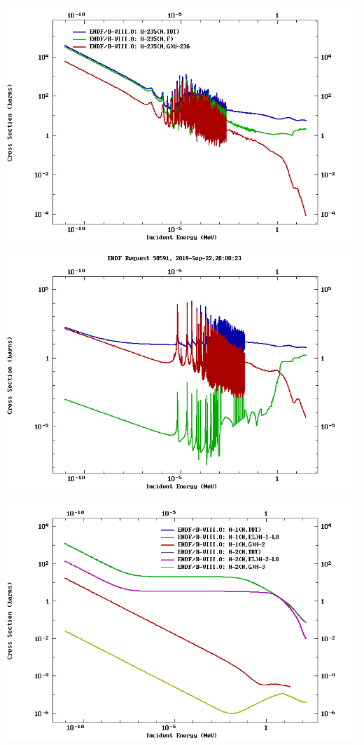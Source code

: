 \documentclass[12pt]{article}
\begin{document}
\begin{center}
\includegraphics[keepaspectratio, width = \textwidth]{u235xs}
\end{center}

\begin{center}
\includegraphics[keepaspectratio, width = \textwidth]{u238xs}
\end{center}

\begin{center}
\includegraphics[keepaspectratio, width = \textwidth]{hdxs}
\end{center}
\end{document}
